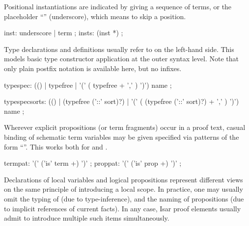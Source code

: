 \begin{isabellebody}
\begin{isamarkuptext}
  Positional instantiations are indicated by giving a sequence of
  terms, or the placeholder ``\isa{{\isacharunderscore}}'' (underscore), which means to
  skip a position.

  \begin{rail}
    inst: underscore | term
    ;
    insts: (inst *)
    ;
  \end{rail}

  Type declarations and definitions usually refer to
   on the left-hand side.  This models basic
  type constructor application at the outer syntax level.  Note that
  only plain postfix notation is available here, but no infixes.

  \begin{rail}
    typespec: (() | typefree | '(' ( typefree + ',' ) ')') name
    ;

    typespecsorts: (() | (typefree ('::' sort)?) | '(' ( (typefree ('::' sort)?) + ',' ) ')') name
    ;
  \end{rail}%
\end{isamarkuptext}%
\isamarkuptrue%
%
\isamarkuptrue%
%
\begin{isamarkuptext}%
Wherever explicit propositions (or term fragments) occur in a proof
  text, casual binding of schematic term variables may be given
  specified via patterns of the form ``''.  This works both for  and .

  \begin{rail}
    termpat: '(' ('is' term +) ')'
    ;
    proppat: '(' ('is' prop +) ')'
    ;
  \end{rail}

  \medskip Declarations of local variables  and
  logical propositions  represent different views on
  the same principle of introducing a local scope.  In practice, one
  may usually omit the typing of  (due to
  type-inference), and the naming of propositions (due to implicit
  references of current facts).  In any case, Isar proof elements
  usually admit to introduce multiple such items simultaneously.


\end{isamarkuptext}
\end{isabellebody}
